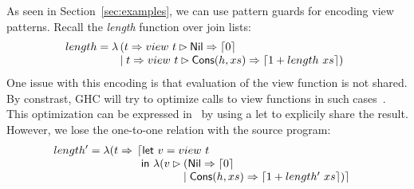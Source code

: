 As seen in Section~\ref{sec:examples}, we can use pattern guards for
encoding view patterns. Recall 
the \textit{length} function over join lists:
\[
  length = \lambda \!\!\begin{array}[t]{l}
                     (t \Rightarrow view~t \rhd 
      \textsf{Nil} \Rightarrow \left\lceil 0\right\rceil \\
      \mid t \Rightarrow view~t \rhd \textsf{Cons}(h,xs) \Rightarrow \left\lceil 1+length~ xs\right\rceil)
    \end{array} 
\]
One issue with this encoding is that evaluation of the view function is not shared.
By constrast, GHC will try to optimize calls to view functions in
such cases~\cite{ghc_guide_view_patterns}.
This optimization can be expressed in \lambdaPMC\ by using a let to explicily share the result.
However, we lose the one-to-one relation with the source program:
\[
  length' = \lambda (t \Rightarrow\!\! \begin{array}[t]{l}
                                    \lceil \textsf{let}~ v = view~t \\
  ~\textsf{in}~ \lambda (v \rhd
  \!\!\!\begin{array}[t]{l}
    (\textsf{Nil} \Rightarrow \left\lceil 0\right\rceil  \\
    \mid \textsf{Cons}(h,xs) \Rightarrow \left\lceil 1+length'~ xs\right\rceil) \rceil
  \end{array}
                                  \end{array}
\]

    

